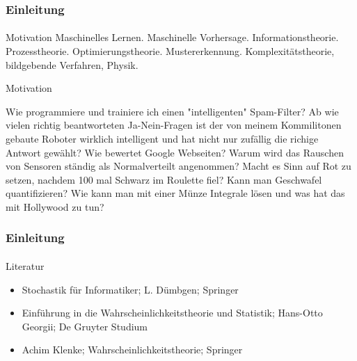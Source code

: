\documentclass{beamer}
\begin{document}
\begin{frame}
    \frametitle{Einleitung}
\framesubtitle{}

\begin{block}{Motivation}
Maschinelles Lernen. Maschinelle Vorhersage. Informationstheorie. Prozesstheorie. Optimierungstheorie. Mustererkennung. Komplexitätstheorie, bildgebende Verfahren, Physik.
\end{block}

\begin{block}{Motivation}

Wie programmiere und trainiere ich einen "intelligenten" Spam-Filter?
Ab wie vielen richtig beantworteten Ja-Nein-Fragen ist der  von meinem Kommilitonen gebaute Roboter wirklich intelligent und  hat nicht nur zufällig die richige Antwort gewählt?
Wie bewertet Google Webseiten?
Warum wird das Rauschen von Sensoren ständig als Normalverteilt angenommen?
Macht es Sinn auf Rot zu setzen, nachdem 100 mal Schwarz im Roulette fiel?
Kann man Geschwafel quantifizieren?
Wie kann man mit einer Münze Integrale lösen und was hat das mit Hollywood zu tun? 
\end{block}

 \end{frame}

\begin{frame}
    \frametitle{Einleitung}
\framesubtitle{}

\begin{block}{Literatur}
\begin{itemize}
\item Stochastik für Informatiker; L. Dümbgen; Springer
\item Einführung in die Wahrscheinlichkeitstheorie und Statistik; Hans-Otto Georgii; De Gruyter Studium
\item Achim Klenke; Wahrscheinlichkeitstheorie; Springer
\end{itemize}
\end{block}


 \end{frame}
\end{document}
